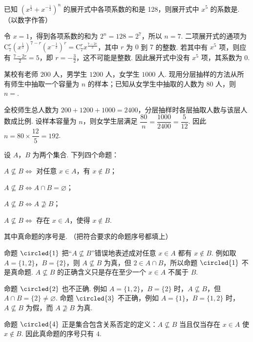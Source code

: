 \begin{problem}
已知 \(\left(x^{\frac{1}{2}}+x^{-\frac{1}{2}}\right)^n\) 的展开式中各项系数的和是 128，则展开式中 \(x^5\) 的系数是\fillinblank{}. （以数字作答）
\end{problem}

\begin{solution}
令 \(x=1\)，得到各项系数的和为 \(2^n=128=2^7\)，所以 \(n=7\). 二项展开式的通项为 \(\mathrm C_7^r\left(x^{\frac{1}{2}}\right)^{7-r}\left(x^{-\frac{1}{2}}\right)^r=\mathrm C_7^r x^{\frac{7-2r}{2}}\)，其中 \(r\) 为 \(0\) 到 \(7\) 的整数. 若其中有 \(x^5\) 项，则应有 \(\frac{7-2r}{2}=5\)，即 \(r=-\frac{3}{2}\)，这不可能是整数. 因此展开式中没有 \(x^5\) 项，其系数为 \(0\).
\end{solution}

\begin{problem}
某校有老师 \(200\) 人，男学生 \(1200\) 人，女学生 \(1000\) 人. 现用分层抽样的方法从所有师生中抽取一个容量为 \(n\) 的样本；已知从女学生中抽取的人数为 \(80\) 人，则 \(n=\)\fillinblank{}.
\end{problem}

\begin{solution}
全校师生总人数为 \(200+1200+1000=2400\)，分层抽样时各层抽取人数与该层人数成比例. 设样本容量为 \(n\)，则女学生层满足
\(\dfrac{80}{n}=\dfrac{1000}{2400}=\dfrac{5}{12}\).
因此 \(n=80\times\dfrac{12}{5}=192\).
\end{solution}

\begin{problem}
设 \(A\)，\(B\) 为两个集合. 下列四个命题：

\begin{circlelist}
\item \(A\not\subseteq B\Leftrightarrow\) 对任意 \(x\in A\)，有 \(x\notin B\)；
\item \(A\not\subseteq B\Leftrightarrow A\cap B=\varnothing\)；
\item \(A\not\subseteq B\Leftrightarrow A\not\supseteq B\)；
\item \(A\not\subseteq B\Leftrightarrow\) 存在 \(x\in A\)，使得 \(x\notin B\).
\end{circlelist}

其中真命题的序号是\fillinblank{}. （把符合要求的命题序号都填上）
\end{problem}

\begin{solution}
命题 \(\circled{1}\) 把“\(A\not\subseteq B\)”错误地表述成对任意 \(x\in A\) 都有 \(x\notin B\). 例如取 \(A=\{1,2\}\)，\(B=\{2\}\)，则 \(A\not\subseteq B\) 为真，但 \(2\in A\cap B\)，所以命题 \(\circled{1}\) 不是真命题. \(A\not\subseteq B\) 的正确含义只是存在至少一个 \(x\in A\) 不属于 \(B\).

命题 \(\circled{2}\) 也不正确. 例如 \(A=\{1,2\}\)，\(B=\{2\}\) 时，\(A\not\subseteq B\)，但 \(A\cap B=\{2\}\neq\varnothing\). 命题 \(\circled{3}\) 不正确，例如 \(A=\{1\}\)，\(B=\{1,2\}\) 时，\(A\not\subseteq B\) 为假，而 \(A\not\supseteq B\) 为真.

命题 \(\circled{4}\) 正是集合包含关系否定的定义：\(A\not\subseteq B\) 当且仅当存在 \(x\in A\) 使 \(x\notin B\). 因此真命题的序号只有 \(4\).
\end{solution}

